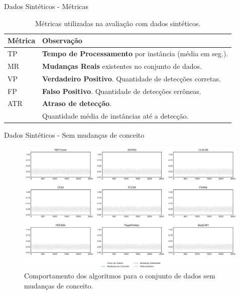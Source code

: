 \documentclass[10pt]{beamer}
\begin{document}
\begin{frame}{Dados Sintéticos - Métricas}
    \begin{table}[h]
        \centering
        \caption{Métricas utilizadas na avaliação com dados sintéticos.}
        \label{tbl:indicadores_analisado}
        \begin{tabularx}{\textwidth}{ll}
        \toprule
        Métrica & Observação \\
        \midrule
        TP       &  \textbf{Tempo de Processamento} por instância (média em seg.). \\
        MR       &  \textbf{Mudanças Reais} existentes no conjunto de dados. \\
        VP       &  \textbf{Verdadeiro Positivo}. Quantidade de detecções corretas. \\
        FP       &  \textbf{Falso Positivo}. Quantidade de detecções errôneas. \\
        ATR      &  \textbf{Atraso de detecção}. \\
                 &  Quantidade média de instâncias até a detecção. \\
        \bottomrule
        \end{tabularx}
    \end{table}
\end{frame}

\begin{frame}{Dados Sintéticos -  Sem mudanças de conceito}
    \begin{figure}[t]
        \begin{center}
            \includegraphics[width=\textwidth]{imagens/nochange.png}
            \caption{Comportamento dos algoritmos para o conjunto de dados sem mudanças de conceito.}
            \label{fig:exp_sem_mudancas}
        \end{center}
    \end{figure}
\end{frame}
\end{document}
